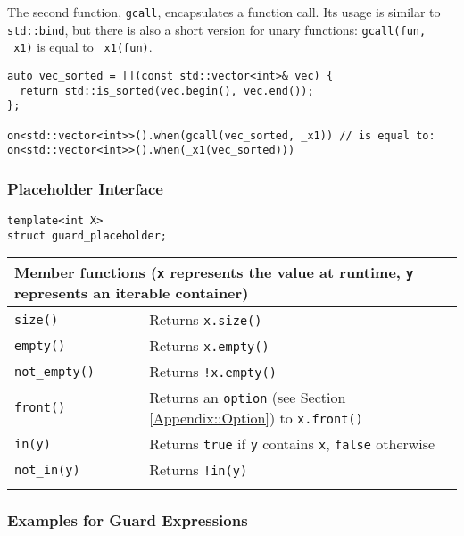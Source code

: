 The second function, \lstinline^gcall^, encapsulates a function call.
Its usage is similar to \lstinline^std::bind^, but there is also a short version for unary functions: \lstinline^gcall(fun, _x1)^ is equal to \lstinline^_x1(fun)^.

\begin{lstlisting}
auto vec_sorted = [](const std::vector<int>& vec) {
  return std::is_sorted(vec.begin(), vec.end());
};

on<std::vector<int>>().when(gcall(vec_sorted, _x1)) // is equal to:
on<std::vector<int>>().when(_x1(vec_sorted)))
\end{lstlisting}

\subsubsection{Placeholder Interface}

\begin{lstlisting}
template<int X>
struct guard_placeholder;
\end{lstlisting}

\begin{tabular*}{\textwidth}{m{0.3\linewidth}m{0.7\linewidth}}
  \multicolumn{2}{m{\linewidth}}{\large{\textbf{Member functions} \small{(\lstinline^x^ represents the value at runtime, \lstinline^y^ represents an iterable container)}}\vspace{3pt}} \\
  \hline
  \lstinline^size()^ & Returns \lstinline^x.size()^ \\
  \hline
  \lstinline^empty()^ & Returns \lstinline^x.empty()^ \\
  \hline
  \lstinline^not_empty()^ & Returns \lstinline^!x.empty()^ \\
  \hline
  \lstinline^front()^ & Returns an \lstinline^option^ (see Section \ref{Appendix::Option}) to \lstinline^x.front()^  \\
  \hline
  \lstinline^in(y)^ & Returns \lstinline^true^ if \lstinline^y^ contains \lstinline^x^, \lstinline^false^ otherwise\\
  \hline
  \lstinline^not_in(y)^ & Returns \lstinline^!in(y)^  \\
  \hline
  \\
\end{tabular*}

\subsubsection{Examples for Guard Expressions}

